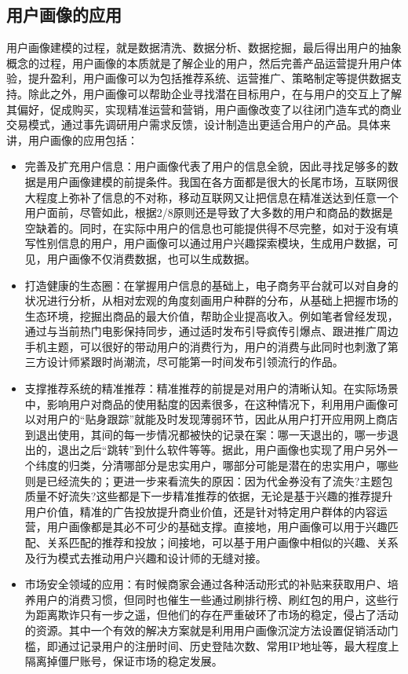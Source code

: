 	\subsection{用户画像的应用}
	用户画像建模的过程，就是数据清洗、数据分析、数据挖掘，最后得出用户的抽象概念的过程，用户画像的本质就是了解企业的用户，然后完善产品运营提升用户体验，提升盈利，用户画像可以为包括推荐系统、运营推广、策略制定等提供数据支持。除此之外，用户画像可以帮助企业寻找潜在目标用户，在与用户的交互上了解其偏好，促成购买，实现精准运营和营销，用户画像改变了以往闭门造车式的商业交易模式，通过事先调研用户需求反馈，设计制造出更适合用户的产品。具体来讲，用户画像的应用包括：
	\begin{itemize}
	\item 完善及扩充用户信息：用户画像代表了用户的信息全貌，因此寻找足够多的数据是用户画像建模的前提条件。我国在各方面都是很大的长尾市场，互联网很大程度上弥补了信息的不对称，移动互联网又让把信息在精准送达到任意一个用户面前，尽管如此，根据2/8原则还是导致了大多数的用户和商品的数据是空缺着的。同时，在实际中用户的信息也可能提供得不尽完整，如对于没有填写性别信息的用户，用户画像可以通过用户兴趣探索模块，生成用户数据，可见，用户画像不仅消费数据，也可以生成数据。
	\item 打造健康的生态圈：在掌握用户信息的基础上，电子商务平台就可以对自身的状况进行分析，从相对宏观的角度刻画用户种群的分布，从基础上把握市场的生态环境，挖掘出商品的最大价值，帮助企业提高收入。例如笔者曾经发现，通过与当前热门电影保持同步，通过适时发布引导疯传引爆点、跟进推广周边手机主题，可以很好的带动用户的消费行为，用户的消费与此同时也刺激了第三方设计师紧跟时尚潮流，尽可能第一时间发布引领流行的作品。
	\item 支撑推荐系统的精准推荐：精准推荐的前提是对用户的清晰认知。在实际场景中，影响用户对商品的使用黏度的因素很多，在这种情况下，利用用户画像可以对用户的“贴身跟踪”就能及时发现薄弱环节，因此从用户打开应用网上商店到退出使用，其间的每一步情况都被快的记录在案：哪一天退出的，哪一步退出的，退出之后“跳转”到什么软件等等。据此，用户画像也实现了用户另外一个纬度的归类，分清哪部分是忠实用户，哪部分可能是潜在的忠实用户，哪些则是已经流失的；更进一步来看流失的原因：因为代金券没有了流失?主题包质量不好流失?这些都是下一步精准推荐的依据，无论是基于兴趣的推荐提升用户价值，精准的广告投放提升商业价值，还是针对特定用户群体的内容运营，用户画像都是其必不可少的基础支撑。直接地，用户画像可以用于兴趣匹配、关系匹配的推荐和投放；间接地，可以基于用户画像中相似的兴趣、关系及行为模式去推动用户兴趣和设计师的无缝对接。
	\item 市场安全领域的应用：有时候商家会通过各种活动形式的补贴来获取用户、培养用户的消费习惯，但同时也催生一些通过刷排行榜、刷红包的用户，这些行为距离欺诈只有一步之遥，但他们的存在严重破环了市场的稳定，侵占了活动的资源。其中一个有效的解决方案就是利用用户画像沉淀方法设置促销活动门槛，即通过记录用户的注册时间、历史登陆次数、常用IP地址等，最大程度上隔离掉僵尸账号，保证市场的稳定发展。
	\end{itemize}

